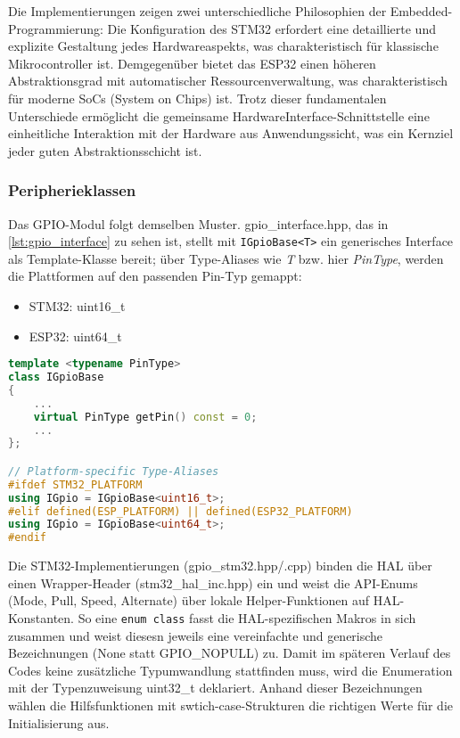 Die Implementierungen zeigen zwei unterschiedliche Philosophien der Embedded-Programmierung: 
Die Konfiguration des STM32 erfordert eine detaillierte und explizite Gestaltung jedes Hardwareaspekts, was charakteristisch für klassische Mikrocontroller ist.
Demgegenüber bietet das ESP32 einen höheren Abstraktionsgrad mit automatischer Ressourcenverwaltung, was charakteristisch für moderne SoCs (System on Chips) ist.
Trotz dieser fundamentalen Unterschiede ermöglicht die gemeinsame HardwareInterface-Schnittstelle eine einheitliche Interaktion mit der Hardware aus Anwendungssicht, was ein Kernziel jeder guten Abstraktionsschicht ist.

\subsubsection{Peripherieklassen}
Das GPIO-Modul folgt demselben Muster.
gpio\_interface.hpp, das in \cref{lst:gpio_interface} zu sehen ist, stellt mit \texttt{IGpioBase<T>} ein generisches Interface als Template-Klasse bereit; über Type-Aliases wie \textit{T} bzw. hier \textit{PinType}, werden die Plattformen auf den passenden Pin-Typ gemappt:

\begin{itemize}
	\item STM32: uint16\_t
	\item ESP32: uint64\_t
\end{itemize}

\newpage

\begin{lstlisting}[language=C++, caption={Ausschnitt aus der Interfaceklasse IGpioBase.}, label={lst:gpio_interface}]
template <typename PinType>
class IGpioBase
{
	...
    virtual PinType getPin() const = 0;
	...	
};

// Platform-specific Type-Aliases
#ifdef STM32_PLATFORM
using IGpio = IGpioBase<uint16_t>;
#elif defined(ESP_PLATFORM) || defined(ESP32_PLATFORM)
using IGpio = IGpioBase<uint64_t>;
#endif
\end{lstlisting}

Die STM32-Implementierungen (gpio\_stm32.hpp/.cpp) binden die HAL über einen Wrapper-Header (stm32\_hal\_inc.hpp) ein und weist die API-Enums (Mode, Pull, Speed, Alternate) über lokale Helper-Funktionen auf HAL-Konstanten.
So eine \texttt{enum class} fasst die HAL-spezifischen Makros in sich zusammen und weist diesesn jeweils eine vereinfachte und generische Bezeichnungen (None statt GPIO\_NOPULL) zu.
Damit im späteren Verlauf des Codes keine zusätzliche Typumwandlung stattfinden muss, wird die Enumeration mit der Typenzuweisung uint32\_t deklariert.
Anhand dieser Bezeichnungen wählen die Hilfsfunktionen mit swtich-case-Strukturen die richtigen Werte für die Initialisierung aus.

